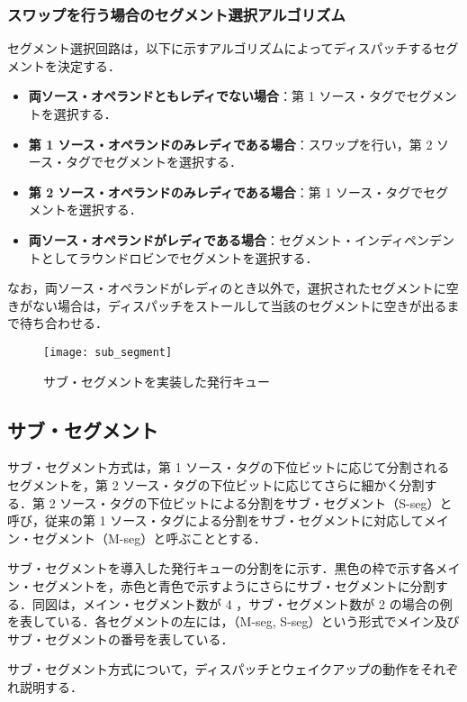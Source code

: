 \subsubsection{スワップを行う場合のセグメント選択アルゴリズム}
セグメント選択回路は，以下に示すアルゴリズムによってディスパッチするセグメントを決定する．
\begin{itemize}
  \item \textbf{両ソース・オペランドともレディでない場合}：第 1 ソース・タグでセグメントを選択する．
  \item \textbf{第 1 ソース・オペランドのみレディである場合}：スワップを行い，第 2 ソース・タグでセグメントを選択する．
  \item \textbf{第 2 ソース・オペランドのみレディである場合}：第 1 ソース・タグでセグメントを選択する．
  \item \textbf{両ソース・オペランドがレディである場合}：セグメント・インディペンデントとしてラウンドロビンでセグメントを選択する．
\end{itemize}
なお，両ソース・オペランドがレディのとき以外で，選択されたセグメントに空きがない場合は，ディスパッチをストールして当該のセグメントに空きが出るまで待ち合わせる．

\begin{figure}[htb]
  \centering
  \texttt{[image: sub\_segment]}
  \caption{サブ・セグメントを実装した発行キュー}
  \label{fig:sub_segment}
\end{figure}

\subsection{サブ・セグメント}
\label{sec:sub_segment}
サブ・セグメント方式は，第 1 ソース・タグの下位ビットに応じて分割されるセグメントを，第 2 ソース・タグの下位ビットに応じてさらに細かく分割する．第 2 ソース・タグの下位ビットによる分割をサブ・セグメント（S-seg）と呼び，従来の第 1 ソース・タグによる分割をサブ・セグメントに対応してメイン・セグメント（M-seg）と呼ぶこととする．

サブ・セグメントを導入した発行キューの分割をに示す．黒色の枠で示す各メイン・セグメントを，赤色と青色で示すようにさらにサブ・セグメントに分割する．同図は，メイン・セグメント数が 4 ，サブ・セグメント数が 2 の場合の例を表している．各セグメントの左には，（M-seg, S-seg）という形式でメイン及びサブ・セグメントの番号を表している．

サブ・セグメント方式について，ディスパッチとウェイクアップの動作をそれぞれ説明する．

